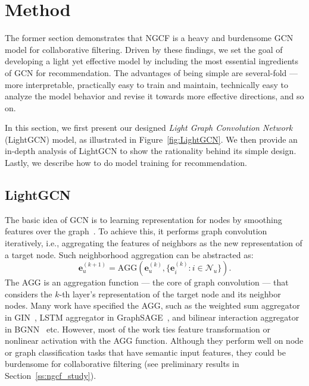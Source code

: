 \section{Method}\label{sec:method}
The former section demonstrates that NGCF is a heavy and burdensome GCN model for  collaborative filtering.
Driven by these findings, we set the goal of developing a light yet effective model by including the most essential ingredients of GCN for recommendation. 
The advantages of being simple are several-fold --- more interpretable, practically easy to train and maintain, technically easy to analyze the model behavior and revise it towards more effective directions, and so on. 

In this section, we first present our designed \textit{Light Graph Convolution Network} (LightGCN) model, as illustrated in Figure~\ref{fig:LightGCN}.
We then provide an in-depth analysis of LightGCN to show the rationality behind its simple design. 
Lastly, we describe how to do model training for recommendation. 

\subsection{LightGCN}
The basic idea of GCN is to learning representation for nodes by smoothing features over the graph~\cite{GCN,SGCN}. 
To achieve this, it performs graph convolution iteratively, i.e., aggregating the features of neighbors as the new representation of a target node. 
Such neighborhood aggregation can be abstracted as:
\begin{equation}
    \textbf{e}_{u}^{(k+1)} = \text{AGG} ( \textbf{e}_{u}^{(k)},  \{ \textbf{e}_i^{(k)} : i \in \mathcal{N}_u \}).
\end{equation}
The AGG is an aggregation function --- the core of graph convolution --- that considers the $k$-th layer's representation of the target node and its neighbor nodes. Many work have specified the AGG, such as the weighted sum aggregator in GIN~\cite{GIN}, LSTM aggregator in GraphSAGE~\cite{GraphSAGE}, and bilinear interaction aggregator in BGNN~\cite{BGNN} etc. However, most of the work ties feature transformation or nonlinear activation with the AGG function. Although they perform well on node or graph classification tasks that have semantic input features, they could be burdensome for collaborative filtering (see preliminary results in Section~\ref{ss:ngcf_study}).

